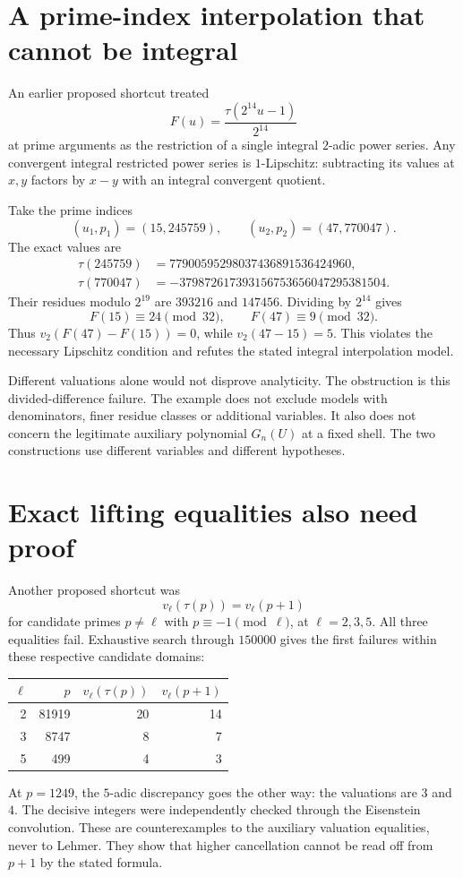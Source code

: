 \section{A prime-index interpolation that cannot be integral}
An earlier proposed shortcut treated
\[
F(u)=\frac{\tau(2^{14}u-1)}{2^{14}}
\]
at prime arguments as the restriction of a single integral $2$-adic power series. Any convergent integral restricted power series is $1$-Lipschitz: subtracting its values at $x,y$ factors by $x-y$ with an integral convergent quotient.

Take the prime indices
\[
(u_1,p_1)=(15,245759),\qquad(u_2,p_2)=(47,770047).
\]
The exact values are
\begin{align*}
\tau(245759)&=77900595298037436891536424960,\\
\tau(770047)&=-379872617393156753656047295381504.
\end{align*}
Their residues modulo $2^{19}$ are $393216$ and $147456$. Dividing by $2^{14}$ gives
\[
F(15)\equiv24\pmod{32},\qquad F(47)\equiv9\pmod{32}.
\]
Thus $v_2(F(47)-F(15))=0$, while $v_2(47-15)=5$. This violates the necessary Lipschitz condition and refutes the stated integral interpolation model.

Different valuations alone would not disprove analyticity. The obstruction is this divided-difference failure. The example does not exclude models with denominators, finer residue classes or additional variables. It also does not concern the legitimate auxiliary polynomial $G_n(U)$ at a fixed shell. The two constructions use different variables and different hypotheses.

\section{Exact lifting equalities also need proof}
Another proposed shortcut was
\[
v_\ell(\tau(p))=v_\ell(p+1)
\]
for candidate primes $p\ne\ell$ with $p\equiv-1\pmod\ell$, at $\ell=2,3,5$. All three equalities fail. Exhaustive search through $150000$ gives the first failures within these respective candidate domains:
\begin{center}
\begin{tabular}{rrrr}
\toprule
$\ell$&$p$&$v_\ell(\tau(p))$&$v_\ell(p+1)$\\
\midrule
2&81919&20&14\\
3&8747&8&7\\
5&499&4&3\\
\bottomrule
\end{tabular}
\end{center}
At $p=1249$, the $5$-adic discrepancy goes the other way: the valuations are $3$ and $4$. The decisive integers were independently checked through the Eisenstein convolution. These are counterexamples to the auxiliary valuation equalities, never to Lehmer. They show that higher cancellation cannot be read off from $p+1$ by the stated formula.
